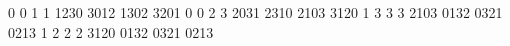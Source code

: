 
   0    0    1    1
 1230 3012 1302 3201
   0    0    2    3
 2031 2310 2103 3120
   1    3    3    3
 2103 0132 0321 0213
   1    2    2    2
 3120 0132 0321 0213
